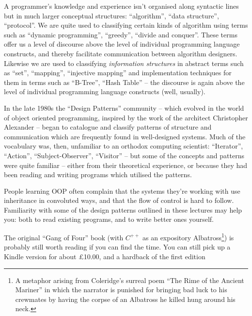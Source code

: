 
A programmer's knowledge and experience isn't organised along syntactic lines
but in much larger conceptual structures: ``algorithm'', ``data structure'', 
``protocol''. We are quite used to classifying
certain kinds of algorithm using terms such as ``dynamic programming'', 
``greedy'', ``divide and conquer''. These terms offer us a level of
discourse above the level of individual programming language constructs,
and thereby facilitate communication between algorithm designers. Likewise
we are used to classifying {\em information structures} in abstract terms
such as ``set'', ``mapping'', ``injective mapping'' and implementation
techniques for them in terms such as ``B-Tree'', ``Hash Table'' -- the
discourse is again above the level of individual programming language constructs 
(well, usually).

In the late 1980s the ``Design Patterns'' community -- which evolved in the
world of object oriented programming, inspired by the work of  
the architect Christopher Alexander -- began to catalogue
and classify patterns of structure and communication which are 
frequently found  in well-designed systems. Much of the vocabulary
was, then, unfamiliar to an orthodox computing scientist: ``Iterator'',
``Action'', ``Subject-Observer'', ``Visitor'' -- but some of the
concepts and patterns were quite familiar -- either from
their theoretical experience, or because they
had been reading and writing programs which utilised the 
patterns.

People learning OOP often complain that the systems they're working with
use inheritance in convoluted ways, and that the flow of control is hard
to follow. Familiarity with some of the design patterns outlined in
these lectures may help you: both to read existing programs, and to
write better ones yourself.


The original ``Gang of Four'' book (with $C^{+\!+}$ as an expository Albatross\footnote{A metaphor
arising from Coleridge's surreal poem ``The Rime of the Ancient Mariner'' in which the
narrator is punished for bringing bad luck to his crewmates by having the
corpse of an Albatross he killed hung around his neck.}) is 
probably still worth reading if you can find the time. You can still pick
up a Kindle  version for about \pounds 10.00, and a hardback of the first edition
